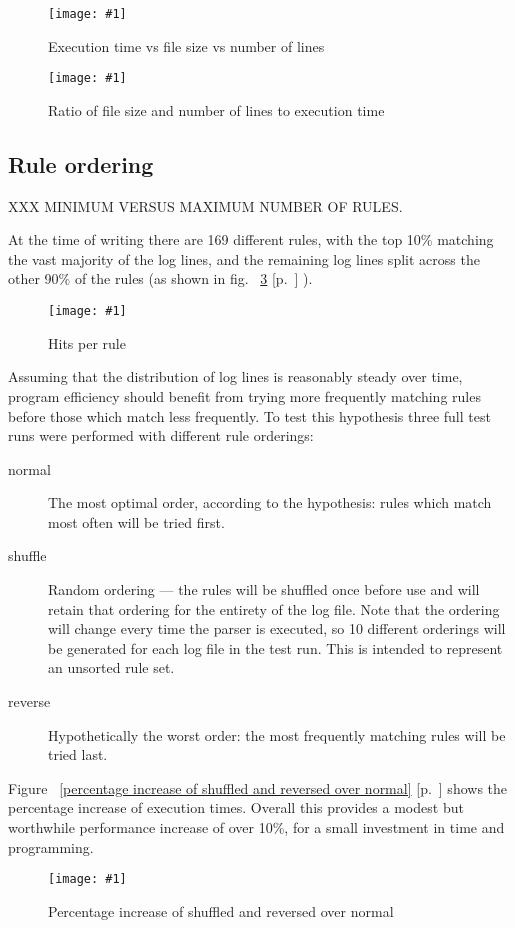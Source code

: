 \documentclass[draft]{svmult}
\newcommand{\showgraph}[3]{
    \begin{figure}[hbt!]
        \caption{#2}\label{#3}
        \texttt{[image: \#1]}
    \end{figure}
}
\newcommand{\refwithpage}[1]{%
    \empty{}\ref{#1} [p.~\pageref{#1}]%
}
\newcommand{\numberOFrules}[0]{%
    169%
}
\begin{document}
\showgraph{build/plot-normal-filesize-numlines}{Execution time vs file
size vs number of lines}{execution time vs file size vs number of lines
graph}

\showgraph{build/plot-normal-filesize-numlines-factor}{Ratio of file
size and number of lines to execution time}{execution time vs file size vs
number lines factor}

\subsection{Rule ordering}

\label{Rule ordering}
\label{rule ordering for efficiency}
\label{rule efficiency}

XXX MINIMUM VERSUS MAXIMUM NUMBER OF RULES\@.

At the time of writing there are \numberOFrules{} different rules, with the
top 10\% matching the vast majority of the log lines, and the remaining log
lines split across the other 90\% of the rules (as shown in
fig.~\refwithpage{rule hits graph}).  \showgraph{build/plot-hits}{Hits per
rule}{rule hits graph} Assuming that the distribution of log lines is
reasonably steady over time, program efficiency should benefit from trying
more frequently matching rules before those which match less frequently.
To test this hypothesis three full test runs were performed with different
rule orderings:

\begin{description}

    \item [normal]  The most optimal order, according to the hypothesis:
        rules which match most often will be tried first.

    \item [shuffle] Random ordering --- the rules will be shuffled once
        before use and will retain that ordering for the entirety of the
        log file.  Note that the ordering will change every time the parser
        is executed, so 10 different orderings will be generated for each
        log file in the test run.  This is intended to represent an
        unsorted rule set.

    \item [reverse] Hypothetically the worst order: the most frequently
        matching rules will be tried last.

\end{description}

Figure~\refwithpage{percentage increase of shuffled and reversed over
normal} shows the percentage increase of execution times.  Overall this
provides a modest but worthwhile performance increase of over 10\%, for a
small investment in time and programming.
\showgraph{build/plot-normal-shuffle-reverse-factor}{Percentage increase of
shuffled and reversed over normal}{percentage increase of shuffled and
reversed over normal}
\end{document}
